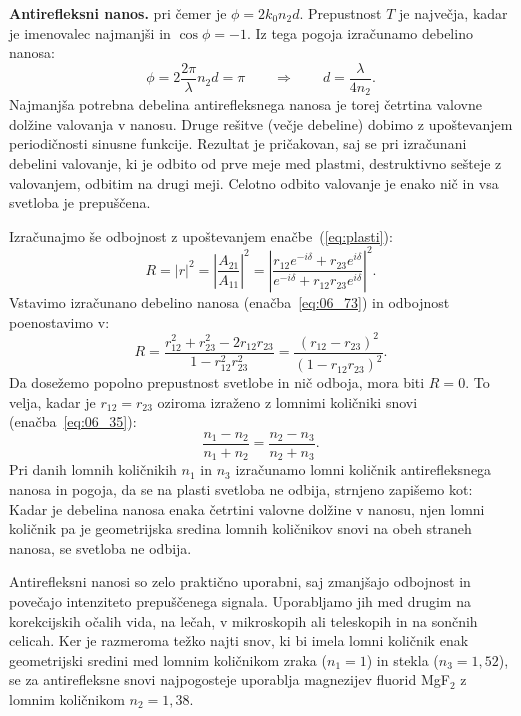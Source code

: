 \begin{example}{\bf Antirefleksni nanos.}
pri čemer je $\phi = 2k_0n_2d$. Prepustnost $T$ je največja, kadar je imenovalec najmanjši in 
$\cos \phi = -1$. Iz tega pogoja izračunamo debelino  nanosa:
\begin{equation}
\phi = 2 \frac{2\pi}{\lambda} n_2 d = \pi \qquad \Longrightarrow \qquad d = \frac{\lambda}{4n_2}.
\label{eq:06_73}
\end{equation}
Najmanjša potrebna debelina antirefleksnega nanosa je torej četrtina valovne dolžine valovanja v nanosu.
Druge rešitve (večje debeline) dobimo z upoštevanjem periodičnosti sinusne funkcije. Rezultat je pričakovan,
saj se pri izračunani debelini valovanje, ki je odbito od prve meje med plastmi, destruktivno sešteje z 
valovanjem, odbitim na drugi meji. Celotno odbito valovanje je enako nič in vsa svetloba je prepuščena. 

Izračunajmo še odbojnost z upoštevanjem enačbe~(\ref{eq:plasti}):
\begin{equation}
R = |r|^2 = \left\rvert \frac{A_{21}}{A_{11}}\right\rvert^2 = 
\left\rvert\frac{r_{12}e^{-i\delta}+r_{23}e^{i\delta}}{e^{-i\delta}+r_{12}r_{23}e^{i\delta}}\right\rvert^2\!\!.
\label{eq:06_74}
\end{equation}
Vstavimo izračunano debelino nanosa (enačba~\ref{eq:06_73}) in odbojnost poenostavimo v:
\begin{equation}
R = \frac{r_{12}^2+r_{23}^2-2r_{12}r_{23}}{1-r_{12}^2r_{23}^2} = \frac{(r_{12}-r_{23})^2}{(1-r_{12}r_{23})^2}.
\label{eq:06_75}
\end{equation}
Da dosežemo popolno prepustnost svetlobe in nič odboja, mora biti $R=0$. To velja, kadar je $r_{12} = r_{23}$
oziroma izraženo z lomnimi količniki snovi (enačba~\ref{eq:06_35}):
\begin{equation}
\frac{n_1-n_2}{n_1+n_2} = \frac{n_2-n_3}{n_2+n_3}.
\label{eq:06_76}
\end{equation}
Pri danih lomnih količnikih $n_1$ in $n_3$ izračunamo lomni količnik antirefleksnega nanosa in pogoja, 
da se na plasti svetloba ne odbija, strnjeno zapišemo kot:
Kadar je debelina nanosa enaka četrtini valovne dolžine v nanosu, njen lomni količnik pa je 
geometrijska sredina lomnih količnikov snovi na obeh straneh nanosa, se svetloba ne odbija. 

Antirefleksni nanosi so zelo praktično uporabni, saj zmanjšajo odbojnost in povečajo intenziteto prepuščenega signala. 
Uporabljamo jih med drugim na korekcijskih očalih vida, na lečah, v mikroskopih ali teleskopih in 
na sončnih celicah. Ker je razmeroma težko najti snov, ki bi imela lomni količnik enak geometrijski sredini
med lomnim količnikom zraka ($n_1=1$) in stekla ($n_3=1,52$), se za antirefleksne snovi najpogosteje uporablja magnezijev 
fluorid MgF$_2$ z lomnim količnikom $n_2=1,38$. 
\end{example}

